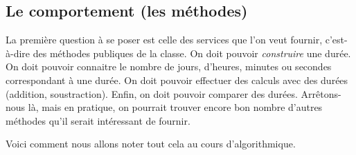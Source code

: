 \newpage 

	\subsection{Le comportement (les méthodes)}
	
		La première question à se poser est celle des services que l’on veut
		fournir, c’est-à-dire des méthodes publiques de la classe. On doit
		pouvoir \textit{construire} une durée. On doit pouvoir connaitre le
		nombre de jours, d’heures, minutes ou secondes correspondant à une durée. On doit
		pouvoir effectuer des calculs avec des durées (addition, soustraction).
		Enfin, on doit pouvoir comparer des durées. Arrêtons-nous là, mais en
		pratique, on pourrait trouver encore bon nombre d’autres méthodes qu’il
		serait intéressant de fournir. 
		
		Voici comment nous allons noter tout cela au cours d'algorithmique.
		
		\begin{algo}
		\end{algo}
		
